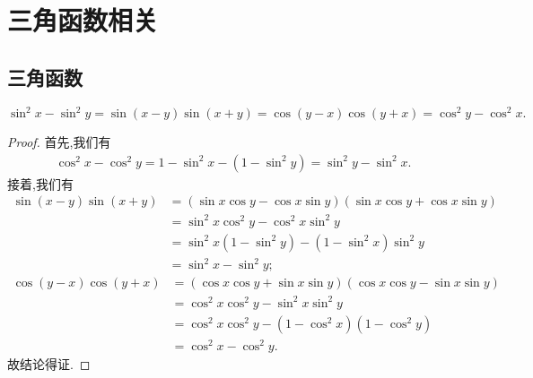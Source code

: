 \documentclass[../../main.tex]{subfiles}
\begin{document}
\section{三角函数相关}

\subsection{三角函数}

\begin{theorem}[三角平方差公式]\label{theorem:三角平方差}
$\sin^2 x-\sin^2 y=\sin(x-y)\sin(x+y)=\cos(y-x)\cos(y+x)=\cos^2 y-\cos^2 x.$
\end{theorem}
\begin{proof}
首先,我们有
\begin{align*}
\cos ^2x-\cos ^2y=1-\sin ^2x-\left( 1-\sin ^2y \right) =\sin ^2y-\sin ^2x.
\end{align*}
接着,我们有
\begin{align*}
\sin(x-y)\sin(x+y) &= (\sin x \cos y - \cos x \sin y)(\sin x \cos y + \cos x \sin y) \\
&= \sin^2 x \cos^2 y - \cos^2 x \sin^2 y \\
&= \sin^2 x (1 - \sin^2 y) - (1 - \sin^2 x) \sin^2 y \\
&= \sin^2 x - \sin^2 y;
\end{align*}
\begin{align*}
\cos(y-x)\cos(y+x) &= (\cos x \cos y + \sin x \sin y)(\cos x \cos y - \sin x \sin y) \\
&= \cos^2 x \cos^2 y - \sin^2 x \sin^2 y \\
&= \cos^2 x \cos^2 y - (1 - \cos^2 x)(1 - \cos^2 y) \\
&= \cos^2 x - \cos^2 y.
\end{align*}
故结论得证.
\end{proof}
\end{document}
